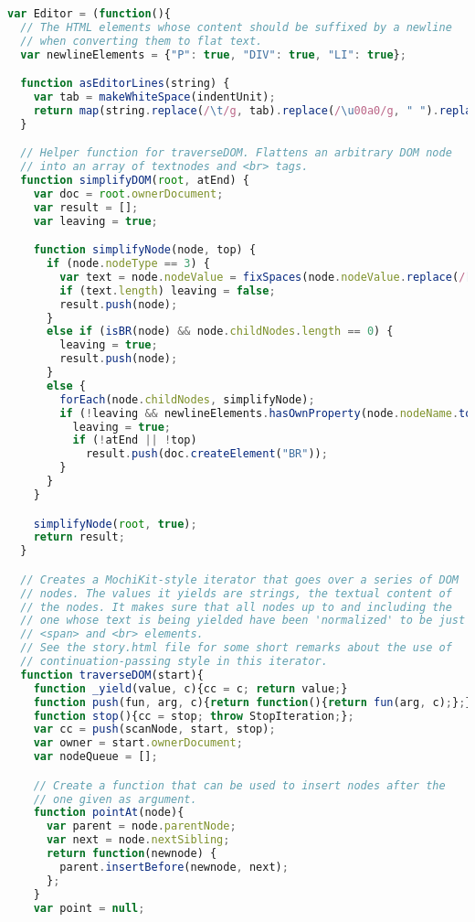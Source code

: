 \begin{lstlisting}[language=Javascript]
var Editor = (function(){
  // The HTML elements whose content should be suffixed by a newline
  // when converting them to flat text.
  var newlineElements = {"P": true, "DIV": true, "LI": true};

  function asEditorLines(string) {
    var tab = makeWhiteSpace(indentUnit);
    return map(string.replace(/\t/g, tab).replace(/\u00a0/g, " ").replace(/\r\n?/g, "\n").split("\n"), fixSpaces);
  }

  // Helper function for traverseDOM. Flattens an arbitrary DOM node
  // into an array of textnodes and <br> tags.
  function simplifyDOM(root, atEnd) {
    var doc = root.ownerDocument;
    var result = [];
    var leaving = true;

    function simplifyNode(node, top) {
      if (node.nodeType == 3) {
        var text = node.nodeValue = fixSpaces(node.nodeValue.replace(/[\r\u200b]/g, "").replace(/\n/g, " "));
        if (text.length) leaving = false;
        result.push(node);
      }
      else if (isBR(node) && node.childNodes.length == 0) {
        leaving = true;
        result.push(node);
      }
      else {
        forEach(node.childNodes, simplifyNode);
        if (!leaving && newlineElements.hasOwnProperty(node.nodeName.toUpperCase())) {
          leaving = true;
          if (!atEnd || !top)
            result.push(doc.createElement("BR"));
        }
      }
    }

    simplifyNode(root, true);
    return result;
  }

  // Creates a MochiKit-style iterator that goes over a series of DOM
  // nodes. The values it yields are strings, the textual content of
  // the nodes. It makes sure that all nodes up to and including the
  // one whose text is being yielded have been 'normalized' to be just
  // <span> and <br> elements.
  // See the story.html file for some short remarks about the use of
  // continuation-passing style in this iterator.
  function traverseDOM(start){
    function _yield(value, c){cc = c; return value;}
    function push(fun, arg, c){return function(){return fun(arg, c);};}
    function stop(){cc = stop; throw StopIteration;};
    var cc = push(scanNode, start, stop);
    var owner = start.ownerDocument;
    var nodeQueue = [];

    // Create a function that can be used to insert nodes after the
    // one given as argument.
    function pointAt(node){
      var parent = node.parentNode;
      var next = node.nextSibling;
      return function(newnode) {
        parent.insertBefore(newnode, next);
      };
    }
    var point = null;


\end{lstlisting}
